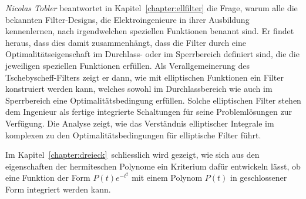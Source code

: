 {\em Nicolas Tobler}
%
%
beantwortet in Kapitel~\ref{chapter:ellfilter} die Frage,
warum alle die bekannten Filter-Designs, die Elektroingenieure in
ihrer Ausbildung kennenlernen, nach irgendwelchen speziellen Funktionen
benannt sind.
Er findet heraus, dass dies damit zusammenhängt, dass die Filter
durch eine Optimalitätseigenschaft im Durchlass- oder im Sperrbereich
definiert sind, die die jeweiligen speziellen Funktionen erfüllen.
Als Verallgemeinerung des Tschebyscheff-Filters zeigt er dann, wie
mit elliptischen Funktionen ein Filter konstruiert werden kann,
welches sowohl im Durchlassbereich wie auch im Sperrbereich eine 
Optimalitätsbedingung erfüllen.
Solche elliptischen Filter stehen dem Ingenieur als fertige integrierte
Schaltungen für seine Problemlösungen zur Verfügung.
Die Analyse zeigt, wie das Verständnis elliptischer Integrale 
im komplexen zu den Optimalitätsbedingungen für elliptische
Filter führt.

Im Kapitel~\ref{chapter:dreieck} schliesslich wird gezeigt,
wie sich aus den eigenschaften der hermiteschen Polynome
ein Kriterium dafür entwickeln lässt, ob eine Funktion der Form
$P(t)e^{-t^2}$ mit einem Polynom $P(t)$ in geschlossener Form
integriert werden kann.
